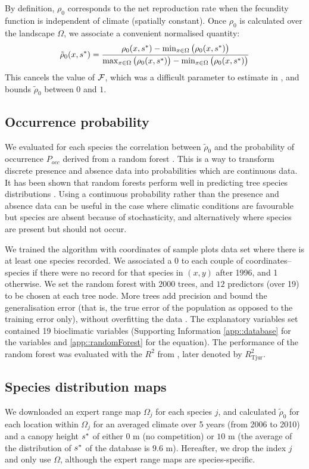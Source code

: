 By definition, $ \rho_0 $ corresponds to the net reproduction rate when the fecundity function is independent of climate (\ie spatially constant). Once $ \rho_0 $ is calculated over the landscape $ \Omega $, we associate a convenient normalised quantity:
\begin{equation} \label{eq::rho0_scaled}
	\tilde \rho_0(x, {s}^{*}) = \frac{\rho_0(x, {s}^{*}) - \min_{x \in \Omega} \big(\rho_0(x, {s}^{*}) \big)}{\max_{x \in \Omega} \big(\rho_0(x, {s}^{*}) \big) - \min_{x \in \Omega} \big(\rho_0(x, {s}^{*}) \big)}
\end{equation}
This cancels the value of $ \mathcal{F} $, which was a difficult parameter to estimate in \citet{Purves2008}, and bounds $ \tilde \rho_0 $ between $ 0 $ and $ 1 $.

\subsection{Occurrence probability}
We evaluated for each species the correlation between $ \tilde \rho_0 $ and the probability of occurrence $ P_{occ} $ derived from a random forest \citep[R package]{randomForest}. This is a way to transform discrete presence and absence data into probabilities which are continuous data. It has been shown that random forests perform well in predicting tree species distributions \citep{Prasad2006}. Using a continuous probability rather than the presence and absence data can be useful in the case where climatic conditions are favourable but species are absent because of stochasticity, and alternatively where species are present but should not occur.

We trained the algorithm with coordinates of sample plots data set where there is at least one species recorded. We associated a 0 to each couple of coordinates--species if there were no record for that species in $ (x, y) $ after 1996, and 1 otherwise. We set the random forest with $ 2000 $ trees, and $ 12 $ predictors (over 19) to be chosen at each tree node. More trees add precision and bound the generalisation error (that is, the true error of the population as opposed to the training error only), without overfitting the data \citep{Prasad2006}. The explanatory variables set contained 19 bioclimatic variables (Supporting Information \ref{app::database} for the variables and \ref{app::randomForest} for the equation). The performance of the random forest was evaluated with the $ R^2 $ from \citet{Tjur2009}, later denoted by $ R_{\text{Tjur}}^2 $.

\subsection{Species distribution maps}
We downloaded an expert range map $ \Omega_j $ \citep{Prasad2003, Little1971} for each species $ j $, and calculated $ \tilde \rho_0 $ for each location within $ \Omega_j $ for an averaged climate over 5 years (from 2006 to 2010) and a canopy height $ {s}^{*} $ of either $ 0 $ m (no competition) or $ 10 $ m (the average of the distribution of $ {s}^{*} $ of the database is $ 9.6 $ m). Hereafter, we drop the index $ j $ and only use $ \Omega $, although the expert range maps are species-specific.


